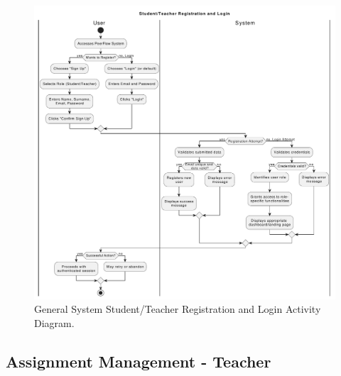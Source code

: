 \clearpage
\vspace*{\fill}
\begin{figure}[h]
    \centering
    \includegraphics[width=1\linewidth]{SRS/imgs/1_GeneralSystemAD.pdf}
    \caption{General System Student/Teacher Registration and Login Activity Diagram.}
    \label{fig:GeneralSystemAC}
\end{figure}
\vspace*{\fill}

\clearpage

\vspace*{-1cm}

\subsection{Assignment Management - Teacher}

